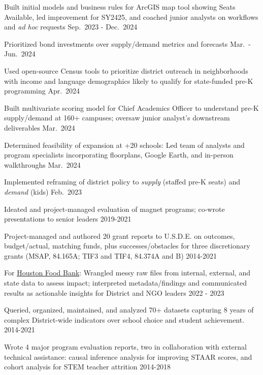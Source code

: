 \documentclass[
  11pt,
]
{article}
\renewenvironment{itemize}{
  \begin{list}{}{
    \setlength{\leftmargin}{1.5em}
  }
}{
  \end{list}
}
\begin{document}
\begin{itemize}
\item
  Built initial models and business rules for ArcGIS map tool showing
  Seats Available, led improvement for SY2425, and coached junior
  analysts on workflows and \emph{ad hoc} requests \hfill Sep.~2023 -
  Dec.~2024
\item
  Prioritized bond investments over supply/demand metrics and forecasts
  \hfill Mar.~- Jun.~2024
\item
  Used open-source Census tools to prioritize district outreach in
  neighborhoods with income and language demographics likely to qualify
  for state-funded pre-K programming \hfill Apr.~2024
\item
  Built multivariate scoring model for Chief Academics Officer to
  understand pre-K supply/demand at 160+ campuses; oversaw junior
  analyst's downstream deliverables \hfill Mar.~2024
\item
  Determined feasibility of expansion at +20 schools: Led team of
  analysts and program specialists incorporating floorplans, Google
  Earth, and in-person walkthroughs \hfill Mar.~2024
\item
  Implemented reframing of district policy to \emph{supply} (staffed
  pre-K seats) and \emph{demand} (kids) \hfill Feb.~2023
\item
  Ideated and project-managed evaluation of magnet programs; co-wrote
  presentations to senior leaders \hfill 2019-2021
\item
  Project-managed and authored 20 grant reports to U.S.D.E. on outcomes,
  budget/actual, matching funds, plus successes/obstacles for three
  discretionary grants (MSAP, 84.165A; TIF3 and TIF4, 84.374A and B)
  \hfill 2014-2021
\item
  For \href{https://www.houstonfoodbank.org/our-programs/}{Houston Food
  Bank}: Wrangled messy raw files from internal, external, and state
  data to assess impact; interpreted metadata/findings and communicated
  results as actionable insights for District and NGO leaders
  \hfill 2022 - 2023
\item
  Queried, organized, maintained, and analyzed 70+ datasets capturing 8
  years of complex District-wide indicators over school choice and
  student achievement. \hfill 2014-2021
\item
  Wrote 4 major program evaluation reports, two in collaboration with
  external technical assistance: causal inference analysis for improving
  STAAR scores, and cohort analysis for STEM teacher attrition
  \hfill 2014-2018
\end{itemize}
\end{document}
